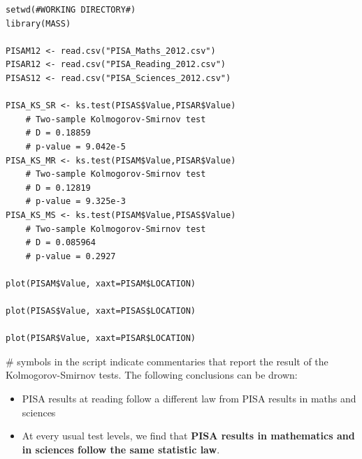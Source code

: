 \documentclass[12pt,a4paper]{article}
\begin{document}
\begin{lstlisting}
setwd(#WORKING DIRECTORY#)
library(MASS)

PISAM12 <- read.csv("PISA_Maths_2012.csv")
PISAR12 <- read.csv("PISA_Reading_2012.csv")
PISAS12 <- read.csv("PISA_Sciences_2012.csv")

PISA_KS_SR <- ks.test(PISAS$Value,PISAR$Value)
	# Two-sample Kolmogorov-Smirnov test
	# D = 0.18859
	# p-value = 9.042e-5
PISA_KS_MR <- ks.test(PISAM$Value,PISAR$Value)
	# Two-sample Kolmogorov-Smirnov test
	# D = 0.12819
	# p-value = 9.325e-3
PISA_KS_MS <- ks.test(PISAM$Value,PISAS$Value)
	# Two-sample Kolmogorov-Smirnov test
	# D = 0.085964
	# p-value = 0.2927
	
plot(PISAM$Value, xaxt=PISAM$LOCATION)

plot(PISAS$Value, xaxt=PISAS$LOCATION)

plot(PISAR$Value, xaxt=PISAR$LOCATION)
\end{lstlisting}

\# symbols in the script indicate commentaries that report the result of the Kolmogorov-Smirnov tests. The following conclusions can be drown:
\begin{itemize}
	\item PISA results at reading follow a different law from PISA results in maths and sciences
	\item At every usual test levels, we find that \textbf{PISA results in mathematics and in sciences follow the same statistic law}.
\end{itemize}
\end{document}
